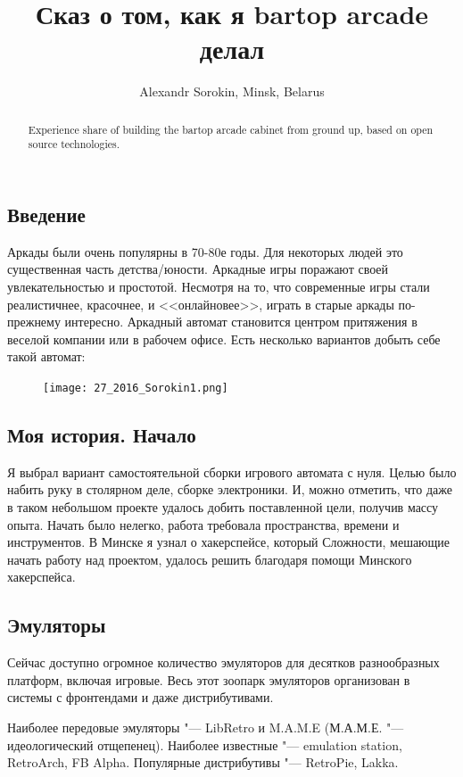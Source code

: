 \documentclass[10pt, a5paper]{article}
\begin{document}
\title{Сказ о том, как я bartop arcade делал}
\author{Alexandr Sorokin, Minsk, Belarus}
\maketitle
\begin{abstract}
Experience share of building the bartop arcade cabinet from ground up, based on open source technologies.
\end{abstract}
\subsection*{Введение}

Аркады были очень популярны в 70-80е годы. Для некоторых людей это существенная часть детства/юности. Аркадные игры поражают своей увлекательностью и простотой. Несмотря на то, что современные игры стали реалистичнее, красочнее, и <<онлайновее>>, играть в старые аркады по-прежнему интересно. Аркадный автомат становится центром притяжения в веселой компании или в рабочем офисе. Есть несколько вариантов добыть себе такой автомат:

\begin{figure}[h!]
  \centering
  \texttt{[image: 27\_2016\_Sorokin1.png]}
\end{figure}


\subsection*{Моя история. Начало}

Я выбрал вариант самостоятельной сборки игрового автомата с  нуля. Целью было набить руку в столярном деле, сборке электроники. И, можно отметить, что даже в таком небольшом проекте удалось добить поставленной цели, получив массу опыта.
Начать было нелегко, работа требовала пространства, времени и инструментов. В Минске я узнал о хакерспейсе, который Сложности, мешающие начать работу над проектом, удалось решить благодаря помощи Минского хакерспейса.

\subsection*{Эмуляторы}

Сейчас доступно огромное количество эмуляторов для десятков разнообразных платформ, включая игровые. Весь этот зоопарк эмуляторов организован в системы с фронтендами и даже дистрибутивами.

Наиболее передовые эмуляторы "--- LibRetro и M.A.M.E \linebreak(М.А.М.Е. "--- идеологический отщепенец). Наиболее известные  "--- emulation station, RetroArch, FB Alpha. Популярные дистрибутивы "--- RetroPie, Lakka.
\end{document}
